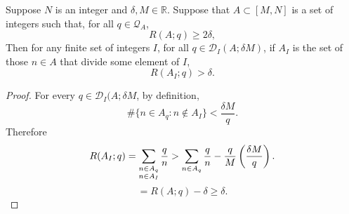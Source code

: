 \begin{lemma}\label{lem:good_d}
\leanok
{}
 Suppose $N$ is an integer and $\delta,M\in \mathbb{R}$. Suppose that $A\subset [M,N]$ is a set of integers such that, for all $q\in \mathcal{Q}_A$,
\[R(A;q) \geq 2\delta,\]
Then for any finite set of integers $I$, for all $q\in\mathcal{D}_I(A;\delta M)$, if $A_I$ is the set of those $n\in A$ that divide some element of $I$,
\[R(A_I;q)> \delta.\]
\end{lemma}
\begin{proof}
  \leanok
For every $q\in \mathcal{D}_I(A;\delta M$, by definition,
\[\#\{ n\in A_q : n\not\in A_I\} < \frac{\delta M}{q}.\]
Therefore
\[R(A_I;q) = \sum_{\substack{n \in A_q\\n\in A_I}}\frac{q}{n}> \sum_{n \in A_q}\frac{q}{n}-\frac{q}{M}\left( \frac{\delta M}{q}\right).\]
  \[=R(A;q) - \delta \geq \delta.\]
\end{proof}


